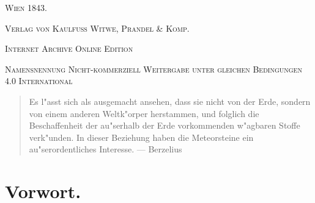\documentclass[a4paper, 11pt, oneside, polutonikogreek, german]{article}
\begin{document}
\begin{titlepage}
	\vspace{1\baselineskip}

	{\small\scshape Wien 1843.}
	
	{\small\scshape{Verlag von Kaulfuss Witwe, Prandel \& Komp.}}
	
	\vspace{0.5\baselineskip} %

    \scshape Internet Archive Online Edition  %
	
	{\scshape\small Namensnennung Nicht-kommerziell Weitergabe unter gleichen Bedingungen 4.0 International} %
\end{titlepage}
\setlength{\parskip}{1mm plus1mm minus1mm}
\clearpage
\tableofcontents
\clearpage
\vspace*{\fill}
\begin{quote}
   Es l"asst sich als ausgemacht ansehen, dass sie nicht von der Erde, sondern von einem anderen Weltk"orper herstammen, und folglich die Beschaffenheit der au"serhalb der Erde vorkommenden w"agbaren Stoffe verk"unden. In dieser Beziehung haben die Meteorsteine ein au"serordentliches Interesse. --- Berzelius
\end{quote}
\vspace*{\fill}
\clearpage
\section*{Vorwort.}
\end{document}
